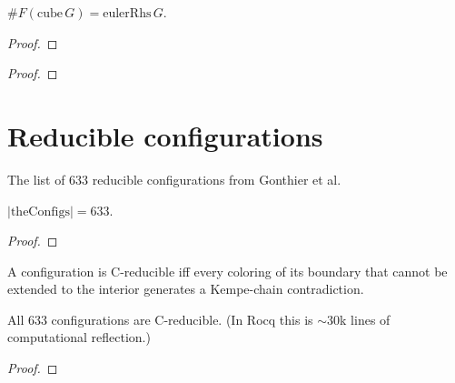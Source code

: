 \begin{theorem}
  \label{thm:fcardFace-cube}
  \leanok
  $\#F(\mathrm{cube}\,G) = \mathrm{eulerRhs}\,G$.
\end{theorem}
\begin{proof}\notready\end{proof}

\begin{theorem}
  \label{thm:planar-cube}
  \leanok
\end{theorem}
\begin{proof}\notready\end{proof}

\chapter{Reducible configurations}


\begin{definition}
  \label{def:theConfigs}
  \leanok
  The list of 633 reducible configurations from Gonthier et al.
\end{definition}

\begin{theorem}
  \label{thm:theConfigs-length}
  \leanok
  $|\mathrm{theConfigs}| = 633$.
\end{theorem}
\begin{proof}\notready\end{proof}

\begin{definition}[C-reducibility]
  \label{def:CfReducible}
  \leanok
  A configuration is C-reducible iff every coloring of its boundary that
  cannot be extended to the interior generates a Kempe-chain contradiction.
\end{definition}

\begin{theorem}[Reducibility]
  \label{thm:reducibility}
  \leanok
  All 633 configurations are C-reducible. (In Rocq this is $\sim$30k lines
  of computational reflection.)
\end{theorem}
\begin{proof}\notready\end{proof}

